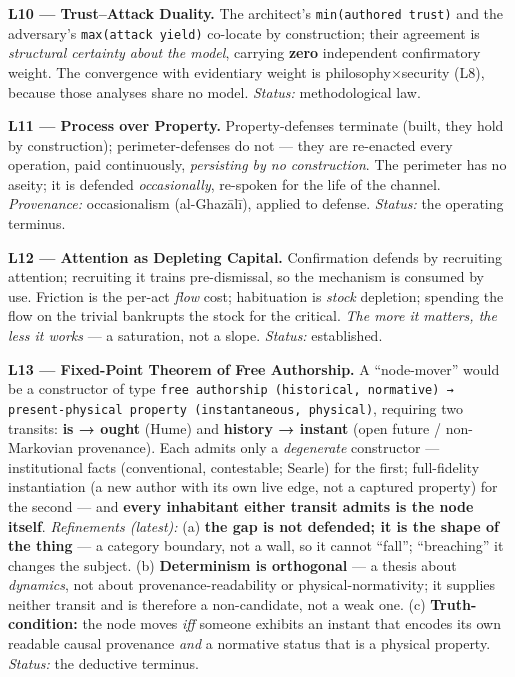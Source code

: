 \documentclass[11pt]{article}
\begin{document}
\textbf{L10 — Trust–Attack Duality.} The architect's \texttt{min(authored trust)} and the adversary's \texttt{max(attack yield)} co-locate by construction; their agreement is \emph{structural certainty about the model}, carrying \textbf{zero} independent confirmatory weight. The convergence with evidentiary weight is philosophy×security (L8), because those analyses share no model. \emph{Status:} methodological law.

\textbf{L11 — Process over Property.} Property-defenses terminate (built, they hold by construction); perimeter-defenses do not — they are re-enacted every operation, paid continuously, \emph{persisting by no construction}. The perimeter has no aseity; it is defended \emph{occasionally}, re-spoken for the life of the channel. \emph{Provenance:} occasionalism (al-Ghazālī), applied to defense. \emph{Status:} the operating terminus.

\textbf{L12 — Attention as Depleting Capital.} Confirmation defends by recruiting attention; recruiting it trains pre-dismissal, so the mechanism is consumed by use. Friction is the per-act \emph{flow} cost; habituation is \emph{stock} depletion; spending the flow on the trivial bankrupts the stock for the critical. \emph{The more it matters, the less it works} — a saturation, not a slope. \emph{Status:} established.

\textbf{L13 — Fixed-Point Theorem of Free Authorship.} A ``node-mover'' would be a constructor of type \texttt{free authorship (historical, normative) → present-physical property (instantaneous, physical)}, requiring two transits: \textbf{is → ought} (Hume) and \textbf{history → instant} (open future /\allowbreak{} non-Markovian provenance). Each admits only a \emph{degenerate} constructor — institutional facts (conventional, contestable; Searle) for the first; full-fidelity instantiation (a new author with its own live edge, not a captured property) for the second — and \textbf{every inhabitant either transit admits is the node itself}. \emph{Refinements (latest):} (a) \textbf{the gap is not defended; it is the shape of the thing} — a category boundary, not a wall, so it cannot ``fall''; ``breaching'' it changes the subject. (b) \textbf{Determinism is orthogonal} — a thesis about \emph{dynamics}, not about provenance-readability or physical-normativity; it supplies neither transit and is therefore a non-candidate, not a weak one. (c) \textbf{Truth-condition:} the node moves \emph{iff} someone exhibits an instant that encodes its own readable causal provenance \emph{and} a normative status that is a physical property. \emph{Status:} the deductive terminus.
\end{document}
